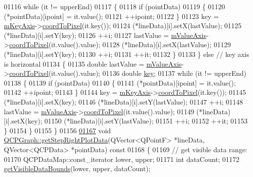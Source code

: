 \begin{DoxyCode}
01116     \textcolor{keywordflow}{while} (it != upperEnd)
01117     \{
01118       \textcolor{keywordflow}{if} (pointData)
01119       \{
01120         (*pointData)[ipoint] = it.value();
01121         ++ipoint;
01122       \}
01123       key = \hyperlink{a00024_a692421b963472fa6e16156a74ba96832}{mKeyAxis}->\hyperlink{a00025_a985ae693b842fb0422b4390fe36d299a}{coordToPixel}(it.key());
01124       (*lineData)[i].setX(lastValue);
01125       (*lineData)[i].setY(key);
01126       ++i;
01127       lastValue = \hyperlink{a00024_acfc46d619ab9598be33b64146da45822}{mValueAxis}->\hyperlink{a00025_a985ae693b842fb0422b4390fe36d299a}{coordToPixel}(it.value().value);
01128       (*lineData)[i].setX(lastValue);
01129       (*lineData)[i].setY(key);
01130       ++i;
01131       ++it;
01132     \}
01133   \} \textcolor{keywordflow}{else} \textcolor{comment}{// key axis is horizontal}
01134   \{
01135     \textcolor{keywordtype}{double} lastValue = \hyperlink{a00024_acfc46d619ab9598be33b64146da45822}{mValueAxis}->\hyperlink{a00025_a985ae693b842fb0422b4390fe36d299a}{coordToPixel}(it.value().value);
01136     \textcolor{keywordtype}{double} \hyperlink{a00116_a94bb892c30911cd62cba0707a5395be4}{key};
01137     \textcolor{keywordflow}{while} (it != upperEnd)
01138     \{
01139       \textcolor{keywordflow}{if} (pointData)
01140       \{
01141         (*pointData)[ipoint] = it.value();
01142         ++ipoint;
01143       \}
01144       key = \hyperlink{a00024_a692421b963472fa6e16156a74ba96832}{mKeyAxis}->\hyperlink{a00025_a985ae693b842fb0422b4390fe36d299a}{coordToPixel}(it.key());
01145       (*lineData)[i].setX(key);
01146       (*lineData)[i].setY(lastValue);
01147       ++i;
01148       lastValue = \hyperlink{a00024_acfc46d619ab9598be33b64146da45822}{mValueAxis}->\hyperlink{a00025_a985ae693b842fb0422b4390fe36d299a}{coordToPixel}(it.value().value);
01149       (*lineData)[i].setX(key);
01150       (*lineData)[i].setY(lastValue);
01151       ++i;
01152       ++it;
01153     \}
01154   \}
01155 \}
01156 
\hypertarget{a00115_source_l01167}{}\hyperlink{a00031_ab2ad46716889c73ab977cf9280de0788}{01167} \textcolor{keywordtype}{void} \hyperlink{a00031_ab2ad46716889c73ab977cf9280de0788}{QCPGraph::getStepRightPlotData}(QVector<QPointF> *lineData, 
      QVector<QCPData> *pointData)\textcolor{keyword}{ const}
01168 \textcolor{keyword}{}\{
01169   \textcolor{comment}{// get visible data range:}
01170   QCPDataMap::const\_iterator lower, upper;
01171   \textcolor{keywordtype}{int} dataCount;
01172   \hyperlink{a00031_a8963c90087cf53b889b29dd59aa41aad}{getVisibleDataBounds}(lower, upper, dataCount);

\end{DoxyCode}
